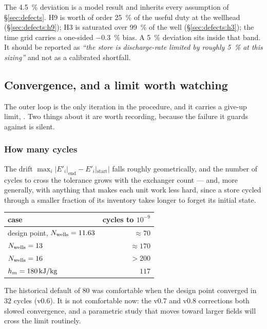 The \SI{+4.5}{\percent} deviation is a model result and inherits every
assumption of \S\ref{sec:defects}. H9 is worth of order \SI{25}{\percent} of the
useful duty at the wellhead (\S\ref{sec:defects:h9}); H3 is saturated over
\SI{99}{\percent} of the well (\S\ref{sec:defects:h3}); the time grid carries a
one-sided \SI{-0.3}{\percent} bias. A \SI{5}{\percent} deviation sits inside
that band. It should be reported as \emph{``the store is discharge-rate limited
by roughly \SI{5}{\percent} at this sizing''} and not as a calibrated shortfall.

\subsection{Convergence, and a limit worth watching}
\label{sec:cyclic:converge}

The outer loop is the only iteration in the procedure, and it carries a give-up
limit, . Two things about it are worth recording, because the
failure it guards against is silent.

\subsubsection*{How many cycles}

The drift $\max_{i}|E'_{i}|_{\mathrm{end}}-E'_{i}|_{\mathrm{start}}|$ falls
roughly geometrically, and the number of cycles to cross the tolerance grows
with the exchanger count --- and, more generally, with anything that makes each
unit work less hard, since a store cycled through a smaller fraction of its
inventory takes longer to forget its initial state.

\begin{center}
\begin{tabular}{@{}l r@{}}
\toprule
case & cycles to $10^{-9}$ \\
\midrule
design point, $N_{\mathrm{wells}}=11.63$ & $\approx70$ \\
$N_{\mathrm{wells}}=13$ & $\approx170$ \\
$N_{\mathrm{wells}}=16$ & $>200$ \\
$\hm=\SI{180}{\kilo\joule\per\kilogram}$ & $117$ \\
\bottomrule
\end{tabular}
\end{center}

\noindent
The historical default of $80$ was comfortable when the design point converged
in $32$ cycles (v0.6). It is not comfortable now: the v0.7 and v0.8 corrections
both slowed convergence, and a parametric study that moves toward larger fields
will cross the limit routinely.

